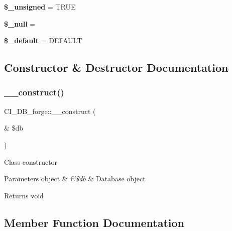 \begin{DoxyCompactItemize}
\mbox{\label{class_c_i___d_b__forge_a9a67b9b49416c8cff771cb3d14a51926}} 
{\bfseries \$\+\_\+unsigned} = T\+R\+UE
\item 
\mbox{\label{class_c_i___d_b__forge_ade1239bba771318c452c9f69044d0e78}} 
{\bfseries \$\+\_\+null} = \textquotesingle{}\textquotesingle{}
\item 
\mbox{\label{class_c_i___d_b__forge_a8135867e807aecec7c393725b64b6946}} 
{\bfseries \$\+\_\+default} = \textquotesingle{} D\+E\+F\+A\+U\+LT \textquotesingle{}
\end{DoxyCompactItemize}


\subsection{Constructor \& Destructor Documentation}
\mbox{\label{class_c_i___d_b__forge_ac695fbde23d492c944b4306e8733f98c}} 
\subsubsection{\texorpdfstring{\+\_\+\+\_\+construct()}{\_\_construct()}}
{\footnotesize\ttfamily C\+I\+\_\+\+D\+B\+\_\+forge\+::\+\_\+\+\_\+construct (\begin{DoxyParamCaption}\item[{\&}]{\$db }\end{DoxyParamCaption})}

Class constructor


\begin{DoxyParams}[1]{Parameters}
object & {\em \&\$db} & Database object \\
\hline
\end{DoxyParams}
\begin{DoxyReturn}{Returns}
void 
\end{DoxyReturn}


\subsection{Member Function Documentation}
\mbox{\label{class_c_i___d_b__forge_a232d3b61f7483d8d960a42a39f4ecc56}} 

